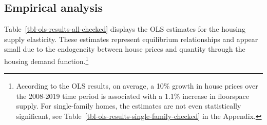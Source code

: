 \documentclass[
  12pt,
]{article}
\begin{document}
\subsection{Empirical analysis}\label{empirical-analysis}

Table~\ref{tbl-ols-results-all-checked} displays the OLS estimates for
the housing supply elasticity. These estimates represent equilibrium
relationships and appear small due to the endogeneity between house
prices and quantity through the housing demand function.\footnote{According
  to the OLS results, on average, a 10\% growth in house prices over the
  2008-2019 time period is associated with a 1.1\% increase in
  floorspace supply. For single-family homes, the estimates are not even
  statistically significant, see
  Table~\ref{tbl-ols-results-single-family-checked} in the Appendix.}
\end{document}
